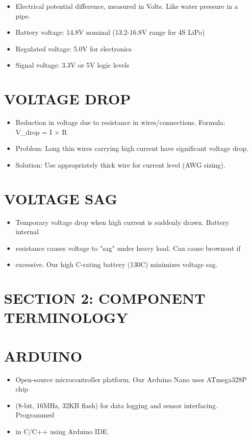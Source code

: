 \documentclass[11pt,letterpaper]{article}
\begin{document}
\begin{itemize}
  \item Electrical potential difference, measured in Volts. Like water pressure in a pipe.
  \item Battery voltage: 14.8V nominal (13.2-16.8V range for 4S LiPo)
  \item Regulated voltage: 5.0V for electronics
  \item Signal voltage: 3.3V or 5V logic levels
\end{itemize}

\section{VOLTAGE DROP}

\begin{itemize}
  \item Reduction in voltage due to resistance in wires/connections. Formula: V\_drop = I $\times$ R
  \item Problem: Long thin wires carrying high current have significant voltage drop.
  \item Solution: Use appropriately thick wire for current level (AWG sizing).
\end{itemize}

\section{VOLTAGE SAG}

\begin{itemize}
  \item Temporary voltage drop when high current is suddenly drawn. Battery internal
  \item resistance causes voltage to "sag" under heavy load. Can cause brownout if
  \item excessive. Our high C-rating battery (130C) minimizes voltage sag.
\end{itemize}

\section{SECTION 2: COMPONENT TERMINOLOGY}

\section{ARDUINO}

\begin{itemize}
  \item Open-source microcontroller platform. Our Arduino Nano uses ATmega328P chip
  \item (8-bit, 16MHz, 32KB flash) for data logging and sensor interfacing. Programmed
  \item in C/C++ using Arduino IDE.
\end{itemize}
\end{document}
